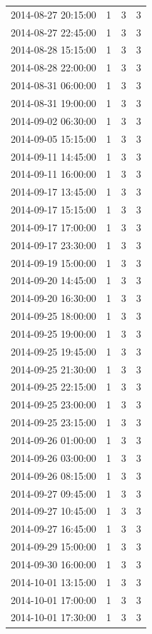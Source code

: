 \begin{tabular}{lrrr}
2014-08-27 20:15:00 & 1 & 3 & 3 \\
2014-08-27 22:45:00 & 1 & 3 & 3 \\
2014-08-28 15:15:00 & 1 & 3 & 3 \\
2014-08-28 22:00:00 & 1 & 3 & 3 \\
2014-08-31 06:00:00 & 1 & 3 & 3 \\
2014-08-31 19:00:00 & 1 & 3 & 3 \\
2014-09-02 06:30:00 & 1 & 3 & 3 \\
2014-09-05 15:15:00 & 1 & 3 & 3 \\
2014-09-11 14:45:00 & 1 & 3 & 3 \\
2014-09-11 16:00:00 & 1 & 3 & 3 \\
2014-09-17 13:45:00 & 1 & 3 & 3 \\
2014-09-17 15:15:00 & 1 & 3 & 3 \\
2014-09-17 17:00:00 & 1 & 3 & 3 \\
2014-09-17 23:30:00 & 1 & 3 & 3 \\
2014-09-19 15:00:00 & 1 & 3 & 3 \\
2014-09-20 14:45:00 & 1 & 3 & 3 \\
2014-09-20 16:30:00 & 1 & 3 & 3 \\
2014-09-25 18:00:00 & 1 & 3 & 3 \\
2014-09-25 19:00:00 & 1 & 3 & 3 \\
2014-09-25 19:45:00 & 1 & 3 & 3 \\
2014-09-25 21:30:00 & 1 & 3 & 3 \\
2014-09-25 22:15:00 & 1 & 3 & 3 \\
2014-09-25 23:00:00 & 1 & 3 & 3 \\
2014-09-25 23:15:00 & 1 & 3 & 3 \\
2014-09-26 01:00:00 & 1 & 3 & 3 \\
2014-09-26 03:00:00 & 1 & 3 & 3 \\
2014-09-26 08:15:00 & 1 & 3 & 3 \\
2014-09-27 09:45:00 & 1 & 3 & 3 \\
2014-09-27 10:45:00 & 1 & 3 & 3 \\
2014-09-27 16:45:00 & 1 & 3 & 3 \\
2014-09-29 15:00:00 & 1 & 3 & 3 \\
2014-09-30 16:00:00 & 1 & 3 & 3 \\
2014-10-01 13:15:00 & 1 & 3 & 3 \\
2014-10-01 17:00:00 & 1 & 3 & 3 \\
2014-10-01 17:30:00 & 1 & 3 & 3 \\

\end{tabular}
